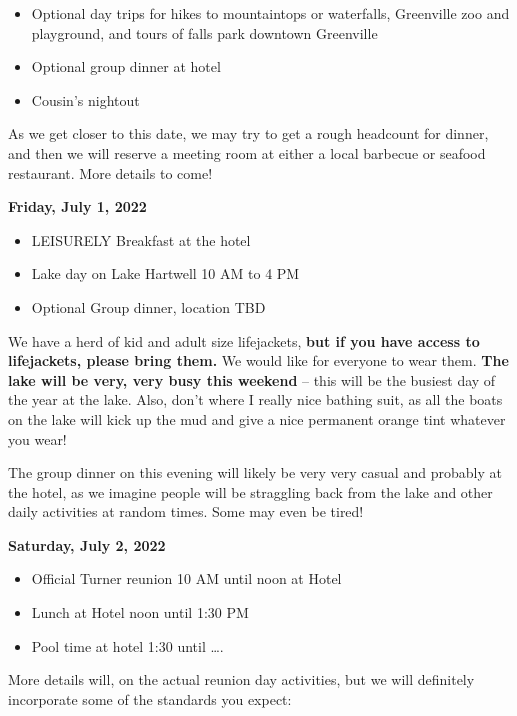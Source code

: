 \documentclass[
]{book}
\providecommand{\tightlist}{%
  \setlength{\itemsep}{0pt}\setlength{\parskip}{0pt}}
\begin{document}
\begin{itemize}
\tightlist
\item
  Optional day trips for hikes to mountaintops or waterfalls, Greenville zoo and playground, and tours of falls park downtown Greenville
\item
  Optional group dinner at hotel
\item
  Cousin's nightout
\end{itemize}

As we get closer to this date, we may try to get a rough headcount for dinner, and then we will reserve a meeting room at either a local barbecue or seafood restaurant. More details to come!

\textbf{Friday, July 1, 2022}

\begin{itemize}
\tightlist
\item
  LEISURELY Breakfast at the hotel
\item
  Lake day on Lake Hartwell 10 AM to 4 PM
\item
  Optional Group dinner, location TBD
\end{itemize}

We have a herd of kid and adult size lifejackets, \textbf{but if you have access to lifejackets, please bring them.} We would like for everyone to wear them. \textbf{The lake will be very, very busy this weekend} -- this will be the busiest day of the year at the lake. Also, don't where I really nice bathing suit, as all the boats on the lake will kick up the mud and give a nice permanent orange tint whatever you wear!

The group dinner on this evening will likely be very very casual and probably at the hotel, as we imagine people will be straggling back from the lake and other daily activities at random times. Some may even be tired!

\textbf{Saturday, July 2, 2022}

\begin{itemize}
\tightlist
\item
  Official Turner reunion 10 AM until noon at Hotel
\item
  Lunch at Hotel noon until 1:30 PM
\item
  Pool time at hotel 1:30 until \ldots.
\end{itemize}

More details will, on the actual reunion day activities, but we will definitely incorporate some of the standards you expect:
\end{document}

